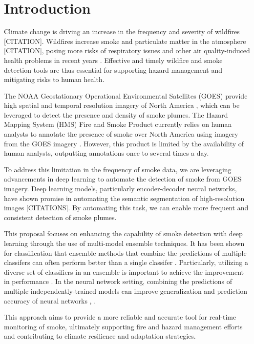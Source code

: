 \documentclass{article}
\begin{document}
\section{Introduction}

Climate change is driving an increase in the frequency and severity of wildfires [CITATION]. Wildfires increase smoke and particulate matter in the atmosphere [CITATION], posing more risks of respiratory issues and other air quality-induced health problems in recent years \citep{wildfire-risk}. Effective and timely wildfire and smoke detection tools are thus essential for supporting hazard management and mitigating risks to human health. 

The NOAA Geostationary Operational Environmental Satellites (GOES) provide high spatial and temporal resolution imagery of North America \citep{GOESbook}, which can be leveraged to detect the presence and density of smoke plumes. The Hazard Mapping System (HMS) Fire and Smoke Product currently relies on human analysts to annotate the presence of smoke over North America using imagery from the GOES imagery \citep{hms}. However, this product is limited by the availability of human analysts, outputting annotations once to several times a day.

To address this limitation in the frequency of smoke data, we are leveraging advancements in deep learning to automate the detection of smoke from GOES imagery. Deep learning models, particularly encoder-decoder neural networks, have shown promise in automating the semantic segmentation of high-resolution images [CITATIONS]. By automating this task, we can enable more frequent and consistent detection of smoke plumes.

This proposal focuses on enhancing the capability of smoke detection with deep learning through the use of multi-model ensemble techniques. It has been shown for classification that ensemble methods that combine the predictions of multiple classifers can often perform better than a single classifer \citep{ensemble-ml}. Particularly, utilizing a diverse set of classifiers in an ensemble is important to achieve the improvement in performance \citep{ensemble-diversity}. In the neural network setting, combining the predictions of multiple independently-trained models can improve generalization and prediction accuracy of neural networks \citep{nn-ensemble}, \citep{nn-ensemble2}. 

This approach aims to provide a more reliable and accurate tool for real-time monitoring of smoke, ultimately supporting fire and hazard management efforts and contributing to climate resilience and adaptation strategies.
\end{document}
